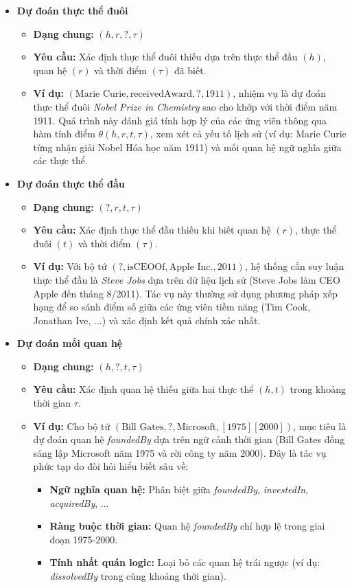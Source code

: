 \begin{itemize}
    \item \textbf{Dự đoán thực thể đuôi}
    \begin{itemize}
        \item \textbf{Dạng chung:} $(h, r, ?, \tau)$
        \item \textbf{Yêu cầu:} Xác định thực thể đuôi thiếu dựa trên thực thể đầu $(h)$, quan hệ $(r)$ và thời điểm $(\tau)$ đã biết.
        \item \textbf{Ví dụ:} $(\text{Marie Curie}, \text{receivedAward}, ?, 1911)$, nhiệm vụ là dự đoán thực thể đuôi \textit{Nobel Prize in Chemistry} sao cho khớp với thời điểm năm 1911. Quá trình này đánh giá tính hợp lý của các ứng viên thông qua hàm tính điểm $\theta(h, r, t, \tau)$, xem xét cả yếu tố lịch sử (ví dụ: Marie Curie từng nhận giải Nobel Hóa học năm 1911) và mối quan hệ ngữ nghĩa giữa các thực thể.
    \end{itemize}
    \item \textbf{Dự đoán thực thể đầu}
    \begin{itemize}
        \item \textbf{Dạng chung:} $(?, r, t, \tau)$
        \item \textbf{Yêu cầu:} Xác định thực thể đầu thiếu khi biết quan hệ $(r)$, thực thể đuôi $(t)$ và thời điểm $(\tau)$.
        \item \textbf{Ví dụ:} Với bộ tứ $(?, \text{isCEOOf}, \text{Apple Inc.}, 2011)$, hệ thống cần suy luận thực thể đầu là \textit{Steve Jobs} dựa trên dữ liệu lịch sử (Steve Jobs làm CEO Apple đến tháng 8/2011). Tác vụ này thường sử dụng phương pháp xếp hạng để so sánh điểm số giữa các ứng viên tiềm năng (Tim Cook, Jonathan Ive, ...) và xác định kết quả chính xác nhất.
    \end{itemize}
    \item \textbf{Dự đoán mối quan hệ}
    \begin{itemize}
        \item \textbf{Dạng chung:} $(h, ?, t, \tau)$
        \item \textbf{Yêu cầu:} Xác định quan hệ thiếu giữa hai thực thể $(h, t)$ trong khoảng thời gian $\tau$.
        \item \textbf{Ví dụ:} Cho bộ tứ $(\text{Bill Gates}, ?, \text{Microsoft}, [1975][2000])$, mục tiêu là dự đoán quan hệ \textit{foundedBy} dựa trên ngữ cảnh thời gian (Bill Gates đồng sáng lập Microsoft năm 1975 và rời công ty năm 2000). Đây là tác vụ phức tạp do đòi hỏi hiểu biết sâu về:
        \begin{itemize}
            \item \textbf{Ngữ nghĩa quan hệ:} Phân biệt giữa \textit{foundedBy}, \textit{investedIn}, \textit{acquiredBy}, ...
            \item \textbf{Ràng buộc thời gian:} Quan hệ \textit{foundedBy} chỉ hợp lệ trong giai đoạn 1975-2000.
            \item \textbf{Tính nhất quán logic:} Loại bỏ các quan hệ trái ngược (ví dụ: \textit{dissolvedBy} trong cùng khoảng thời gian).
        \end{itemize}
    \end{itemize}
\end{itemize}

